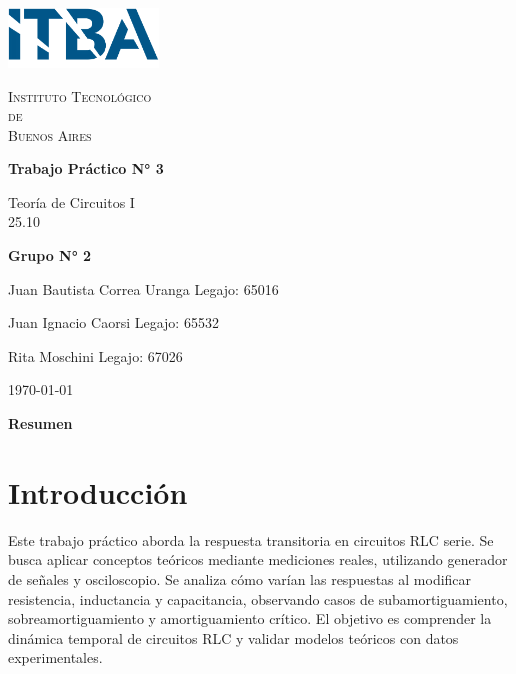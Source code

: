 \documentclass{article}
\newcommand{\Facultad}{Instituto Tecnológico \\de\\ Buenos Aires} %
\newcommand{\TPn}{Trabajo Práctico N° 3}
\begin{document}
\begin{titlepage} %

        \begin{flushleft}
            \centering
            \includegraphics[width=0.3\textwidth]{Logo_ITBA.png}
        \end{flushleft}

        \centering
            
        {\scshape\LARGE \Facultad \par} %
        \vspace{1cm}                    %


        {\huge\bfseries \TPn \par}
        \vspace{1.5cm}
        {\Large Teoría de Circuitos I\\ 25.10 \par}
        \vfill                      %
        {\Large \bfseries Grupo N° 2 \par}
        \vspace{1cm}
        {\large Juan Bautista Correa Uranga \hfill Legajo: 65016 \par} %
        {\large Juan Ignacio Caorsi \hfill Legajo: 65532  \par}
        {\large Rita Moschini \hfill Legajo: 67026 \par} 
        \vfill
        {\large \today\par}
        \vfil

    \end{titlepage}

{\centering \LARGE \bfseries Resumen \par}

\newpage

\tableofcontents %

\newpage

\section{Introducción}
    Este trabajo práctico aborda la respuesta transitoria
     en circuitos RLC serie. Se busca aplicar conceptos 
     teóricos mediante mediciones reales, utilizando generador 
     de señales y osciloscopio. Se analiza cómo varían las
      respuestas al modificar resistencia, inductancia y 
      capacitancia, observando casos de subamortiguamiento,
       sobreamortiguamiento y amortiguamiento crítico. 
       El objetivo es comprender la dinámica temporal 
       de circuitos RLC y validar modelos teóricos
       con datos experimentales.
\end{document}
